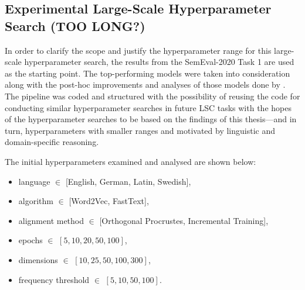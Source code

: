 \subsection{Experimental Large-Scale Hyperparameter Search (TOO LONG?)}

In order to clarify the scope and justify the hyperparameter range for this large-scale hyperparameter search, the results from the SemEval-2020 Task 1 are used as the starting point. The top-performing models were taken into consideration along with the post-hoc improvements and analyses of those models done by \citet{kaiser-etal-2020-ims}. The pipeline was coded and structured with the possibility of reusing the code for conducting similar hyperparameter searches in future LSC tasks with the hopes of the hyperparameter searches to be based on the findings of this thesis—and in turn, hyperparameters with smaller ranges and motivated by linguistic and domain-specific reasoning. 




The initial hyperparameters examined and analysed are shown below:
\begin{itemize}
    \item language $\in$ [English, German, Latin, Swedish],
    \item algorithm $\in$ [Word2Vec, FastText],
    \item alignment method $\in$ [Orthogonal Procrustes, Incremental Training],
    \item epochs $\in$ $[5, 10, 20, 50, 100]$,
    \item dimensions $\in$ $[10, 25, 50, 100, 300]$,
    \item frequency threshold $\in$ $[5, 10, 50, 100]$.
\end{itemize}%


